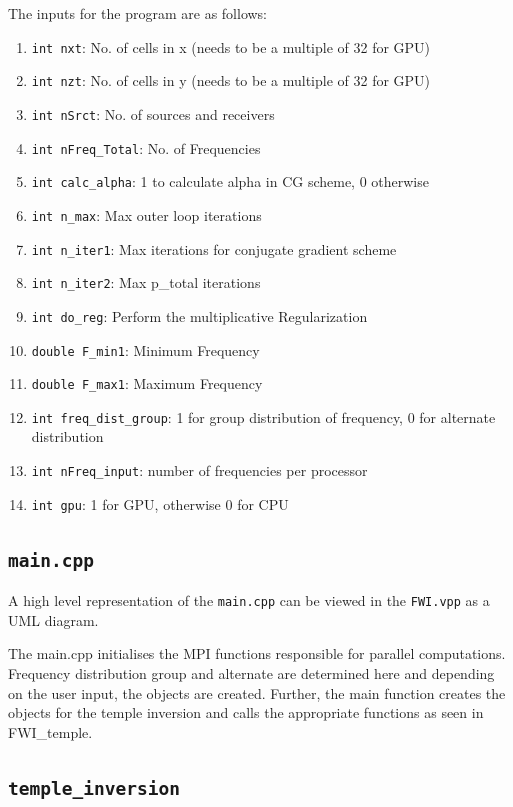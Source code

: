 \documentclass[10pt,a4paper]{article}
\begin{document}
The inputs for the program are as follows:
\begin{enumerate}
    \item \texttt{int nxt}: No. of cells in x (needs to be a multiple of 32 for GPU)
    \item \texttt{int nzt}: No. of cells in y (needs to be a multiple of 32 for GPU)
    \item \texttt{int nSrct}: No. of sources and receivers
    \item \texttt{int nFreq\_Total}: No. of Frequencies
    \item \texttt{int calc\_alpha}: 1 to calculate alpha in CG scheme, 0 otherwise
    \item \texttt{int n\_max}: Max outer loop iterations
    \item \texttt{int n\_iter1}: Max iterations for conjugate gradient scheme
    \item \texttt{int n\_iter2}: Max p\_total iterations
    \item \texttt{int do\_reg}: Perform the multiplicative Regularization
    \item \texttt{double F\_min1}: Minimum Frequency
    \item \texttt{double F\_max1}: Maximum Frequency
    \item \texttt{int freq\_dist\_group}: 1 for group distribution of frequency, 0 for alternate distribution
    \item \texttt{int nFreq\_input}: number of frequencies per processor
    \item\texttt{int gpu}: 1 for GPU, otherwise 0 for CPU
\end{enumerate}

\subsection{\texttt{main.cpp}}

A high level representation of the \texttt{main.cpp} can be viewed in the \texttt{FWI.vpp} as a UML diagram.
\newline

The main.cpp initialises the MPI functions responsible for parallel computations. Frequency distribution group and alternate are determined here and depending on the user input, the objects are created. Further, the main function creates the objects for the temple inversion and calls the appropriate functions as seen in FWI\_temple.

\subsection{\texttt{temple\_inversion}}
\end{document}
